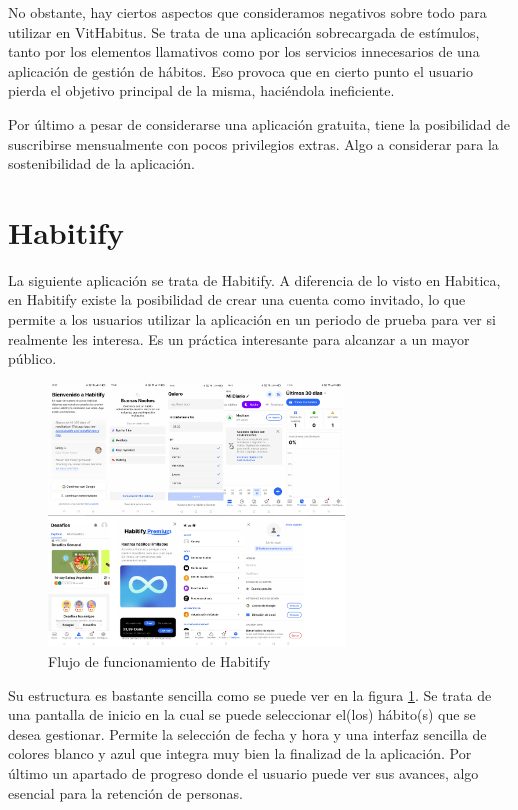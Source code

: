 No obstante, hay ciertos aspectos que consideramos negativos sobre todo para utilizar en VitHabitus. Se trata de una aplicación sobrecargada de estímulos, tanto por los elementos llamativos como por los servicios innecesarios de una aplicación de gestión de hábitos. Eso provoca que en cierto punto el usuario pierda el objetivo principal de la misma, haciéndola ineficiente.

Por último a pesar de considerarse una aplicación gratuita, tiene la posibilidad de suscribirse mensualmente con pocos privilegios extras. Algo a considerar para la sostenibilidad de la aplicación.

\section{Habitify}

La siguiente aplicación se trata de Habitify. A diferencia de lo visto en Habitica, en Habitify existe la posibilidad de crear una cuenta como invitado, lo que permite a los usuarios utilizar la aplicación en un periodo de prueba para ver si realmente les interesa. Es un práctica interesante para alcanzar a un mayor público. 

\begin{figure}[h]
	\centering
	\includegraphics[width = 0.7\textwidth]{Imagenes/apps_images/habitify.png}
	\caption{Flujo de funcionamiento de Habitify}
	\label{fig:habitify}
\end{figure}

Su estructura es bastante sencilla como se puede ver en la figura \ref{fig:habitify}. Se trata de una pantalla de inicio en la cual se puede seleccionar el(los) hábito(s) que se desea gestionar. Permite la selección de fecha y hora y una interfaz sencilla de colores blanco y azul que integra muy bien la finalizad de la aplicación. Por último un apartado de progreso donde el usuario puede ver sus avances, algo esencial para la retención de personas. 

